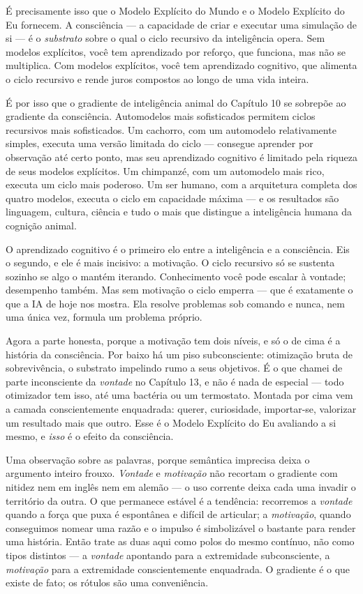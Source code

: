 \documentclass[11pt, twoside, openright]{book}
\begin{document}
É precisamente isso que o Modelo Explícito do Mundo e o Modelo Explícito do Eu fornecem. A consciência --- a capacidade de criar e executar uma simulação de si --- é o \textit{substrato} sobre o qual o ciclo recursivo da inteligência opera. Sem modelos explícitos, você tem aprendizado por reforço, que funciona, mas não se multiplica. Com modelos explícitos, você tem aprendizado cognitivo, que alimenta o ciclo recursivo e rende juros compostos ao longo de uma vida inteira.

É por isso que o gradiente de inteligência animal do Capítulo 10 se sobrepõe ao gradiente da consciência. Automodelos mais sofisticados permitem ciclos recursivos mais sofisticados. Um cachorro, com um automodelo relativamente simples, executa uma versão limitada do ciclo --- consegue aprender por observação até certo ponto, mas seu aprendizado cognitivo é limitado pela riqueza de seus modelos explícitos. Um chimpanzé, com um automodelo mais rico, executa um ciclo mais poderoso. Um ser humano, com a arquitetura completa dos quatro modelos, executa o ciclo em capacidade máxima --- e os resultados são linguagem, cultura, ciência e tudo o mais que distingue a inteligência humana da cognição animal.

O aprendizado cognitivo é o primeiro elo entre a inteligência e a consciência. Eis o segundo, e ele é mais incisivo: a motivação. O ciclo recursivo só se sustenta sozinho se algo o mantém iterando. Conhecimento você pode escalar à vontade; desempenho também. Mas sem motivação o ciclo emperra --- que é exatamente o que a IA de hoje nos mostra. Ela resolve problemas sob comando e nunca, nem uma única vez, formula um problema próprio.

Agora a parte honesta, porque a motivação tem dois níveis, e só o de cima é a história da consciência. Por baixo há um piso subconsciente: otimização bruta de sobrevivência, o substrato impelindo rumo a seus objetivos. É o que chamei de parte inconsciente da \textit{vontade} no Capítulo 13, e não é nada de especial --- todo otimizador tem isso, até uma bactéria ou um termostato. Montada por cima vem a camada conscientemente enquadrada: querer, curiosidade, importar-se, valorizar um resultado mais que outro. Esse é o Modelo Explícito do Eu avaliando a si mesmo, e \textit{isso} é o efeito da consciência.

Uma observação sobre as palavras, porque semântica imprecisa deixa o argumento inteiro frouxo. \textit{Vontade} e \textit{motivação} não recortam o gradiente com nitidez nem em inglês nem em alemão --- o uso corrente deixa cada uma invadir o território da outra. O que permanece estável é a tendência: recorremos a \textit{vontade} quando a força que puxa é espontânea e difícil de articular; a \textit{motivação}, quando conseguimos nomear uma razão e o impulso é simbolizável o bastante para render uma história. Então trate as duas aqui como polos do mesmo contínuo, não como tipos distintos --- a \textit{vontade} apontando para a extremidade subconsciente, a \textit{motivação} para a extremidade conscientemente enquadrada. O gradiente é o que existe de fato; os rótulos são uma conveniência.
\end{document}
